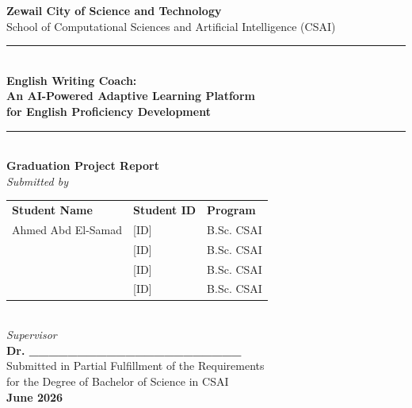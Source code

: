 \documentclass[12pt, a4paper]{report}
\begin{document}
\begin{titlepage}
\begin{center}

\vspace*{0.5cm}

{\Large \textbf{Zewail City of Science and Technology}}\\[0.2cm]
{\large School of Computational Sciences and Artificial Intelligence (CSAI)}\\[1.5cm]

\rule{\linewidth}{1pt}\\[0.4cm]
{\LARGE \textbf{English Writing Coach:\\[0.3cm]
An AI-Powered Adaptive Learning Platform\\[0.3cm]
for English Proficiency Development}}\\[0.4cm]
\rule{\linewidth}{1pt}\\[1.5cm]

{\large \textbf{Graduation Project Report}}\\[1.2cm]

{\large \textit{Submitted by}}\\[0.5cm]
\begin{tabular}{lll}
\textbf{Student Name}   & \textbf{Student ID} & \textbf{Program} \\[4pt]
Ahmed Abd El-Samad      & [ID]                & B.Sc. CSAI       \\
[Team Member 2]         & [ID]                & B.Sc. CSAI       \\
[Team Member 3]         & [ID]                & B.Sc. CSAI       \\
[Team Member 4]         & [ID]                & B.Sc. CSAI       \\
\end{tabular}\\[1.2cm]

{\large \textit{Supervisor}}\\[0.3cm]
{\large \textbf{Dr. \_\_\_\_\_\_\_\_\_\_\_\_\_\_\_\_\_\_\_\_\_\_}}\\[1.2cm]

{\large Submitted in Partial Fulfillment of the Requirements\\
for the Degree of Bachelor of Science in CSAI}\\[1cm]

{\large \textbf{June 2026}}

\end{center}
\end{titlepage}
\end{document}
